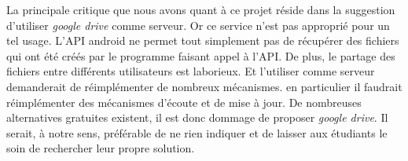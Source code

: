 La principale critique que nous avons quant à ce projet réside dans la suggestion d'utiliser \textit{google drive} comme serveur.
Or ce service n'est pas approprié pour un tel usage. L'API android ne permet tout simplement pas de récupérer des fichiers qui
ont été créés par le programme faisant appel à l'API. De plus, le partage des fichiers entre différents utilisateurs est
laborieux. Et l'utiliser comme serveur demanderait  de réimplémenter de nombreux mécanismes. en particulier il faudrait
réimplémenter des mécanismes d'écoute et de mise à jour. De nombreuses alternatives gratuites existent, il est donc dommage de
proposer \textit{google drive}. Il serait, à notre sens, préférable de ne rien indiquer et de laisser aux étudiants le soin de
rechercher leur propre solution.
